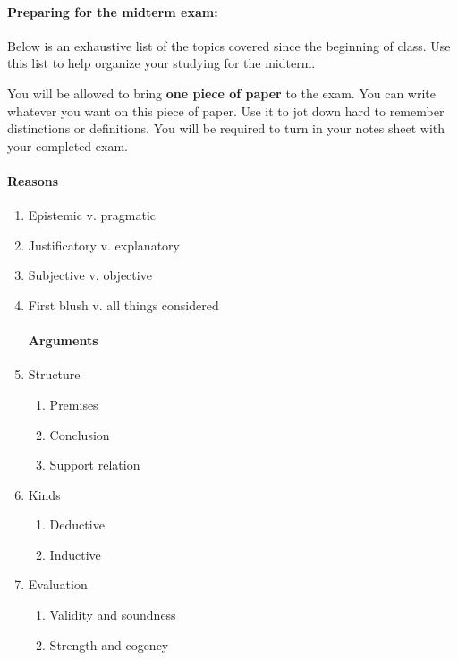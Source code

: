 \documentclass[10pt,landscape]{article}
\begin{document}
\paragraph{Preparing for the midterm exam:} Below is an exhaustive list of the topics covered since the beginning of class.  Use this list to help organize your studying for the midterm.

\vspace{3mm}

You will be allowed to bring \textbf{one piece of paper} to the exam.  You can write whatever you want on this piece of paper.  Use it to jot down hard to remember distinctions or definitions.  You will be required to turn in your notes sheet with your completed exam.

\hrulefill

\begin{multicols}{2}
 
\paragraph{Reasons}
  \begin{enumerate}
   \item Epistemic v. pragmatic
   \item Justificatory v. explanatory
   \item Subjective v. objective
   \item First blush v. all things considered
  
\paragraph{Arguments}
   \item Structure
    \begin{enumerate}
     \item Premises
     \item Conclusion
     \item Support relation
    \end{enumerate}
   \item Kinds
    \begin{enumerate}
     \item Deductive
     \item Inductive
    \end{enumerate}
   \item Evaluation
    \begin{enumerate}
     \item Validity and soundness
     \item Strength and cogency
    \end{enumerate}
  

\end{enumerate}
\end{multicols}
\end{document}
